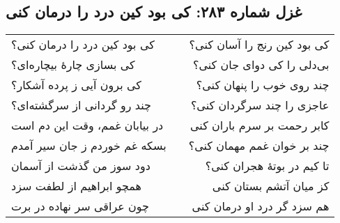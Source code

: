 \begin{center}
\section*{غزل شماره ۲۸۳: کی بود کین درد را درمان کنی}
\label{sec:283}
\begin{longtable}{l p{0.5cm} r}
کی بود کین درد را درمان کنی؟
&&
کی بود کین رنج را آسان کنی؟
\\
کی بسازی چارهٔ بیچاره‌ای؟
&&
بی‌دلی را کی دوای جان کنی؟
\\
کی برون آیی ز پرده آشکار؟
&&
چند روی خوب را پنهان کنی؟
\\
چند رو گردانی از سرگشته‌ای؟
&&
عاجزی را چند سرگردان کنی؟
\\
در بیابان غمم، وقت این دم است
&&
کابر رحمت بر سرم باران کنی
\\
بسکه غم خوردم ز جان سیر آمدم
&&
چند بر خوان غمم مهمان کنی؟
\\
دود سوز من گذشت از آسمان
&&
تا کیم در بوتهٔ هجران کنی؟
\\
همچو ابراهیم از لطفت سزد
&&
کز میان آتشم بستان کنی
\\
چون عراقی سر نهاده در برت
&&
هم سزد گر درد او درمان کنی
\\
\end{longtable}
\end{center}
